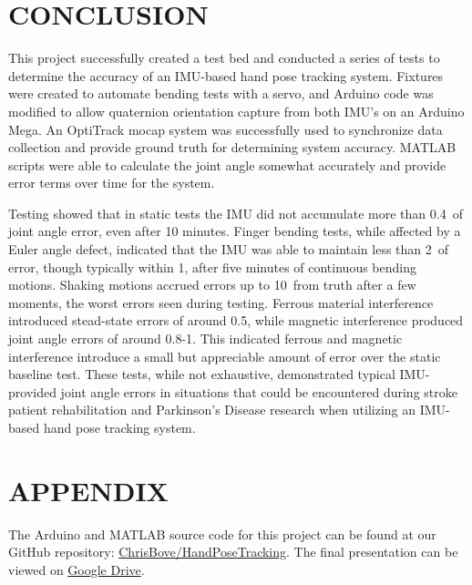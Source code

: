 \documentclass[letterpaper, 10 pt, conference]{ieeeconf}  %
\begin{document}
\section{CONCLUSION}
This project successfully created a test bed and conducted a series of tests to determine the accuracy of an IMU-based hand pose tracking system. Fixtures were created to automate bending tests with a servo, and Arduino code was modified to allow quaternion orientation capture from both IMU's on an Arduino Mega. An OptiTrack mocap system was successfully used to synchronize data collection and provide ground truth for determining system accuracy. MATLAB scripts were able to calculate the joint angle somewhat accurately and provide error terms over time for the system. 

Testing showed that in static tests the IMU did not accumulate more than 0.4\degree\ of joint angle error, even after 10 minutes. Finger bending tests, while affected by a Euler angle defect, indicated that the IMU was able to maintain less than 2\degree\ of error, though typically within 1\degree, after five minutes of continuous bending motions. Shaking motions accrued errors up to 10\degree\ from truth after a few moments, the worst errors seen during testing. Ferrous material interference introduced stead-state errors of around 0.5\degree, while magnetic interference produced joint angle errors of around 0.8-1\degree. This indicated ferrous and magnetic interference introduce a small but appreciable amount of error over the static baseline test. These tests, while not exhaustive, demonstrated typical IMU-provided joint angle errors in situations that could be encountered during stroke patient rehabilitation and Parkinson's Disease research when utilizing an IMU-based hand pose tracking system. 

\addtolength{\textheight}{-12cm}   %

\section*{APPENDIX}
The Arduino and MATLAB source code for this project can be found at our GitHub repository:  \href{https://github.com/ChrisBove/HandPoseTracking}{ChrisBove/HandPoseTracking}.
The final presentation can be viewed on \href{https://docs.google.com/presentation/d/1VDLMp_ZAbCT3yII7-D-Xm1Q3-hwkLWy0UZxRYme4dzw/edit?usp=sharing}{Google Drive}.
\end{document}
